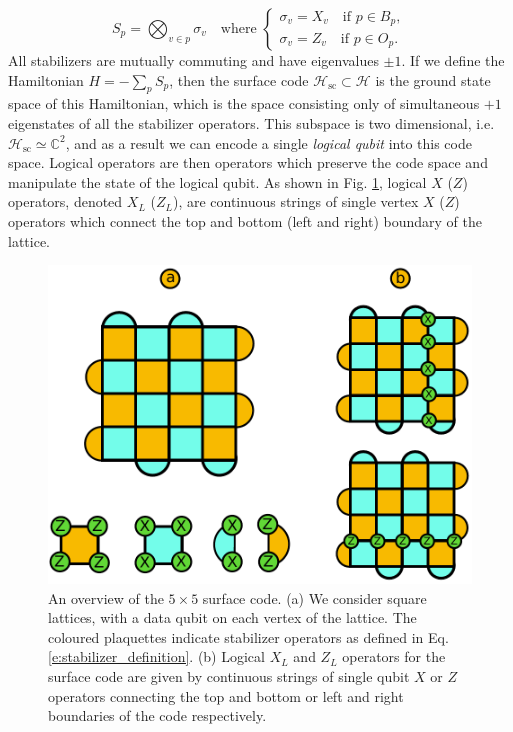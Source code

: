 \documentclass[twocolumn,preprintnumbers,amsmath,amssymb,notitlepage,nofootinbib,longbibliography,superscriptaddress,aps,pra,10pt]{revtex4-1}
\begin{document}
        \begin{equation}\label{e:stabilizer_definition}
            S_p = \bigotimes_{v\in p} \sigma_v \quad \text{where   }   \begin{cases}
                                                                        \sigma_v = X_v \quad \text{if } p \in B_p,\\
                                                                         \sigma_v = Z_v \quad \text{if } p \in O_p.
                                                                     \end{cases}
        \end{equation}
        All stabilizers are mutually commuting and have eigenvalues $\pm 1$.
        If we define the Hamiltonian $H = -\sum_p S_p$, then the surface code $\mathcal{H}_\mathrm{sc} \subset \mathcal{H}$ is the ground state space of this Hamiltonian, which is the space consisting only of simultaneous $+1$ eigenstates of all the stabilizer operators. 
        This subspace is two dimensional, i.e. $\mathcal{H}_\mathrm{sc} \simeq \mathbb{C}^2$, and as a result we can encode a single \textit{logical qubit} into this code space.
        Logical operators are then operators which preserve the code space and manipulate the state of the logical qubit. As shown in Fig. \ref{f:surface_code}, logical $X$ ($Z$) operators, denoted $X_L$ ($Z_L$), are continuous strings of single vertex $X$ ($Z$) operators which connect the top and bottom (left and right) boundary of the lattice.


        \begin{figure}
            \centering
            \includegraphics[width=0.8\linewidth]{figures/surface_code.pdf}
            \caption{An overview of the $5 \times 5$ surface code. (a) We consider square lattices, with a data qubit on each vertex of the lattice. The coloured plaquettes indicate stabilizer operators as defined in Eq. \eqref{e:stabilizer_definition}. (b) Logical $X_L$ and $Z_L$ operators for the surface code are given by continuous strings of single qubit $X$ or $Z$ operators connecting the top and bottom or left and right boundaries of the code respectively.}\label{f:surface_code}
        \end{figure}
\end{document}
